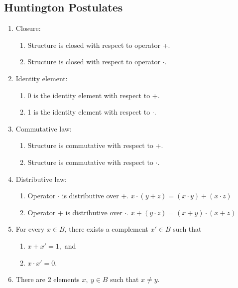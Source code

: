 \documentclass[a4paper]{article}
\begin{document}
\subsection{Huntington Postulates}
\begin{enumerate}
    \item Closure:
    \begin{enumerate}[label=\alph*)]
        \item Structure is closed with respect to operator +.
        \item Structure is closed with respect to operator $\cdot$.
    \end{enumerate}
    \item Identity element:
    \begin{enumerate}[label=\alph*)]
        \item 0 is the identity element with respect to +.
        \item 1 is the identity element with respect to $\cdot$.
    \end{enumerate}
    \newpage
    \item Commutative law:
    \begin{enumerate}[label=\alph*)]
        \item Structure is commutative with respect to +.
        \item Structure is commutative with respect to $\cdot$.
    \end{enumerate}
    \item Distributive law:
    \begin{enumerate}[label=\alph*)]
        \item Operator $\cdot$ is distributive over +. \qquad $x\cdot(y+z) = (x\cdot y)+(x\cdot z)$
        \item Operator + is distributive over $\cdot$. \qquad $x+(y\cdot z) = (x+y)\cdot(x+z)$
    \end{enumerate}
    \item For every $x\in B$, there exists a complement $x'\in B$ such that
    \begin{enumerate}
        \item $x+x'=1,$ and
        \item $x\cdot x'=0$.
    \end{enumerate}
    \item There are 2 elements $x,\ y\in B$ such that $x\neq y$.
\end{enumerate}
\end{document}
